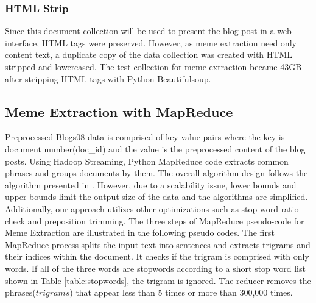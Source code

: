 \documentclass{sig-alternate}
\begin{document}
\subsubsection{HTML Strip}

Since this document collection will be used to present the blog post in a web interface, HTML tags were preserved. However, as meme extraction need only content text, a duplicate copy of the data collection  was created with HTML stripped and lowercased. The test collection for meme extraction became 43GB after stripping HTML tags with Python Beautifulsoup.




\subsection{Meme Extraction with MapReduce}

Preprocessed Blogs08 data is comprised of key-value pairs where the key is document number(doc\_id) and the value is the preprocessed content of the blog posts. Using Hadoop Streaming, Python MapReduce code extracts common phrases and groups documents by them. The overall algorithm design follows the algorithm presented in \cite{Kolak2008}. However, due to a scalability issue, lower bounds and upper bounds limit the output size of the data and the algorithms are simplified.  Additionally, our approach utilizes other optimizations such as stop word ratio check and preposition trimming. The three steps of MapReduce pseudo-code for Meme Extraction are illustrated in the following pseudo codes. The first MapReduce process splits the input text into sentences and extracts trigrams and their indices within the document. It checks if the trigram is comprised with only words. If all of the three words are stopwords according to a short stop word list shown in Table \ref{table:stopwords}, the trigram is ignored. The reducer removes the phrases($trigrams$) that appear less than 5 times or more than 300,000 times.
\end{document}
